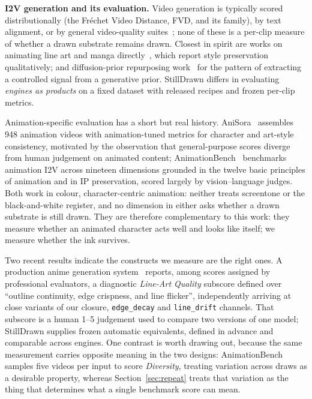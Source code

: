 \documentclass[11pt]{article}
\begin{document}
\textbf{I2V generation and its evaluation.} Video generation is typically
scored distributionally (the Fr\'echet Video Distance, FVD, and its family), by text alignment, or by general
video-quality suites~\cite{huang2023vbench,liu2023evalcrafter}; none of these
is a per-clip measure of whether a drawn
substrate remains drawn. Closest in spirit are works on animating line art
and manga
directly~\cite{meng2024anidoc,zhang2025panelsouls,zhan2025coprosketch},
which report style preservation qualitatively; and diffusion-prior
repurposing work~\cite{ke2023marigold,thawatdamrongkit2026dma} for the
pattern of extracting a controlled signal from a generative prior. StillDrawn differs in evaluating
\emph{engines as products} on a fixed dataset with released recipes and frozen
per-clip metrics.

Animation-specific evaluation has a short but real history.
AniSora~\cite{jiang2024anisora} assembles 948 animation videos with
animation-tuned metrics for character and art-style consistency, motivated by
the observation that general-purpose scores diverge from human judgement on
animated content; AnimationBench~\cite{wu2026animationbench} benchmarks
animation I2V across nineteen dimensions grounded in the twelve basic
principles of animation and in IP preservation, scored largely by
vision--language judges. Both work in colour, character-centric
animation: neither treats screentone or the black-and-white register, and no
dimension in either asks whether a drawn substrate is still drawn. They are
therefore complementary to this work: they measure whether an animated
character acts well and looks like itself; we measure whether the ink
survives.

Two recent results indicate the constructs we measure are the right ones. A
production anime generation system~\cite{tencent2026animatrix} reports, among
scores assigned by professional evaluators, a diagnostic \emph{Line-Art
Quality} subscore defined over ``outline continuity, edge crispness, and line
flicker'', independently arriving at close variants of our closure,
\texttt{edge\_decay} and \texttt{line\_drift} channels. That subscore is a
human 1--5 judgement used to compare two versions of one model; StillDrawn
supplies frozen automatic equivalents, defined in advance and comparable
across engines. One
contrast is worth drawing out, because the same measurement carries opposite
meaning in the two designs: AnimationBench samples five videos per input to
score \emph{Diversity}, treating variation across draws as a desirable
property, whereas Section~\ref{sec:repeat} treats that variation as the thing
that determines what a single benchmark score can mean.
\end{document}
